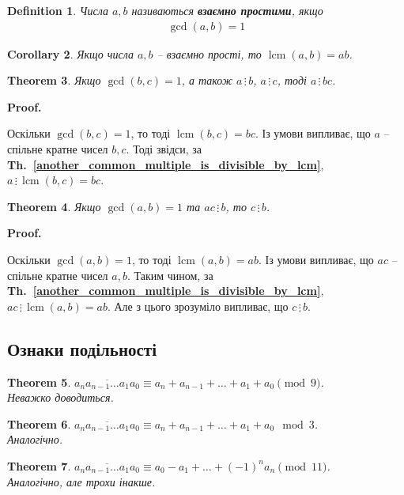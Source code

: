 \documentclass[a4paper, 10pt]{article}
\makeatletter
\def\qed{$\blacksquare$}
\newcommand\thref[1]{\textbf{Th.~\ref{#1}}}
\theoremstyle{theoremdd}
\newtheorem{theorem}{Theorem}[subsection]
\theoremstyle{theoremdd}
\newtheorem{definition}[theorem]{Definition}
\theoremstyle{theoremdd}
\theoremstyle{theoremdd}
\theoremstyle{theoremdd}
\theoremstyle{theoremdd}
\theoremstyle{theoremdd}
\theoremstyle{theoremdd}
\newtheorem{corollary}[theorem]{Corollary}
\renewenvironment{proof}[1][Proof.\\]{\par
\pushQED{\hfill \qed}%
\normalfont \topsep6\p@\@plus6\p@\relax
\trivlist
\item\relax
{\bfseries
#1\@addpunct{.}}\hspace\labelsep\ignorespaces
}{%
\popQED\endtrivlist\@endpefalse
}
\newcommand\divisibleBy{\, \vdots \,}
\DeclareMathOperator{\lcm}{lcm}
\makeatother
\begin{document}
\begin{definition}
Числа $a,b$ називаються \textbf{взаємно простими}, якщо
\begin{align*}
\gcd(a,b) = 1
\end{align*}
\end{definition}

\begin{corollary}
Якщо числа $a,b$ -- взаємно прості, то $\lcm(a,b) = ab$.
\end{corollary}

\begin{theorem}
Якщо $\gcd(b,c) = 1$, а також $a \divisibleBy b$, $a \divisibleBy c$, тоді $a \divisibleBy bc$.
\end{theorem}

\begin{proof}
Оскільки $\gcd(b,c) = 1$, то тоді $\lcm(b,c) = bc$. Із умови випливає, що $a$ -- спільне кратне чисел $b,c$. Тоді звідси, за \thref{another_common_multiple_is_divisible_by_lcm}, $a \divisibleBy \lcm(b,c) = bc$.
\end{proof}

\begin{theorem}
Якщо $\gcd(a,b) = 1$ та $ac \divisibleBy b$, то $c \divisibleBy b$.
\end{theorem}

\begin{proof}
Оскільки $\gcd(a,b) = 1$, то тоді $\lcm(a,b) = ab$. Із умови випливає, що $ac$ -- спільне кратне чисел $a,b$. Таким чином, за \thref{another_common_multiple_is_divisible_by_lcm}, $ac \divisibleBy \lcm(a,b) = ab$. Але з цього зрозуміло випливає, що $c \divisibleBy b$.
\end{proof}

\subsection{Ознаки подільності}
\begin{theorem}
$\overline{a_na_{n-1}\dots a_1a_0} \equiv a_n + a_{n-1} + \dots + a_1 + a_0 \pmod 9$.\\
\textit{Неважко доводиться.}
\end{theorem}

\begin{theorem}
$\overline{a_na_{n-1}\dots a_1a_0} \equiv a_n + a_{n-1} + \dots + a_1 + a_0 \mod 3$.\\
\textit{Аналогічно.}
\end{theorem}

\begin{theorem}
$\overline{a_na_{n-1}\dots a_1a_0} \equiv a_0 - a_1 + \dots + (-1)^n a_n \pmod {11}$.\\
\textit{Аналогічно, але трохи інакше.}
\end{theorem}
\end{document}

